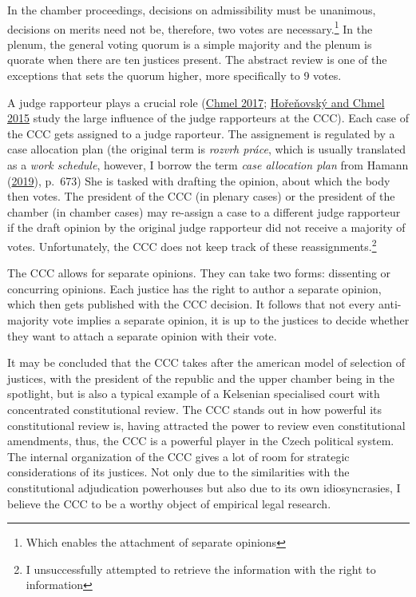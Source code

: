 \documentclass[
  11pt,
]{article}
\begin{document}
In the chamber proceedings, decisions on admissibility must be
unanimous, decisions on merits need not be, therefore, two votes are
necessary.\footnote{Which enables the attachment of separate opinions}
In the plenum, the general voting quorum is a simple majority and the
plenum is quorate when there are ten justices present. The abstract
review is one of the exceptions that sets the quorum higher, more
specifically to 9 votes.

A judge rapporteur plays a crucial role
(\protect\hyperlink{ref-chmelZpravodajoveSenatyVliv2017}{Chmel 2017};
\protect\hyperlink{ref-horenovskyProcessMakingConstitutional2015}{Hořeňovský
and Chmel 2015} study the large influence of the judge rapporteurs at
the CCC). Each case of the CCC gets assigned to a judge raporteur. The
assignement is regulated by a case allocation plan (the original term is
\emph{rozvrh práce}, which is usually translated as a \emph{work
schedule}, however, I borrow the term \emph{case allocation plan} from
Hamann (\protect\hyperlink{ref-hamannGermanFederalCourts2019}{2019}),
p.~673) She is tasked with drafting the opinion, about which the body
then votes. The president of the CCC (in plenary cases) or the president
of the chamber (in chamber cases) may re-assign a case to a different
judge rapporteur if the draft opinion by the original judge rapporteur
did not receive a majority of votes. Unfortunately, the CCC does not
keep track of these reassignments.\footnote{I unsuccessfully attempted
  to retrieve the information with the right to information}

The CCC allows for separate opinions. They can take two forms:
dissenting or concurring opinions. Each justice has the right to author
a separate opinion, which then gets published with the CCC decision. It
follows that not every anti-majority vote implies a separate opinion, it
is up to the justices to decide whether they want to attach a separate
opinion with their vote.

It may be concluded that the CCC takes after the american model of
selection of justices, with the president of the republic and the upper
chamber being in the spotlight, but is also a typical example of a
Kelsenian specialised court with concentrated constitutional review. The
CCC stands out in how powerful its constitutional review is, having
attracted the power to review even constitutional amendments, thus, the
CCC is a powerful player in the Czech political system. The internal
organization of the CCC gives a lot of room for strategic considerations
of its justices. Not only due to the similarities with the
constitutional adjudication powerhouses but also due to its own
idiosyncrasies, I believe the CCC to be a worthy object of empirical
legal research.
\end{document}
